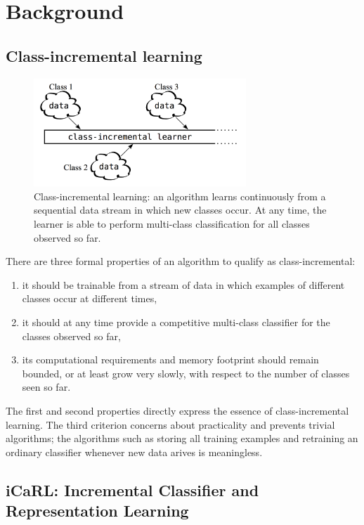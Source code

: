 
\section{Background}
\label{sec:background}

\subsection{Class-incremental learning}
\label{sec:cil}

\begin{figure}[h]
\includegraphics[width=80mm]{data/class-incremental_learning.png}
\centering
\caption{Class-incremental learning: an algorithm learns continuously from a sequential data stream in which new classes occur. At any time, the learner is able to perform multi-class classification for all classes observed so far. \label{fig:class-incremental_learning}}
\end{figure}

There are three formal properties of an algorithm to qualify as class-incremental:
\begin{enumerate}
\item it should be trainable from a stream of data in which examples of different classes occur at different times,
\item it should at any time provide a competitive multi-class classifier for the classes observed so far,
\item its computational requirements and memory footprint should remain bounded, or at least grow very slowly, with respect to the number of classes seen so far.
\end{enumerate}
The first and second properties directly express the essence of class-incremental learning. The third criterion concerns about practicality and prevents trivial algorithms; the algorithms such as storing all training examples and retraining an ordinary classifier whenever new data arives is meaningless.


\subsection{iCaRL: Incremental Classifier and Representation Learning}
\label{sec:icarl}


